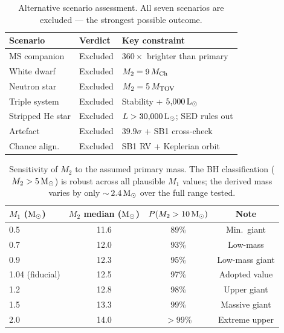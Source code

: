 \documentclass[usenatbib,fleqn]{mnras}
\newcommand{\Msun}{{\rm M}_\odot}
\newcommand{\Lsun}{{\rm L}_\odot}
\begin{document}
\begin{table}
\centering
\caption{Alternative scenario assessment.  All seven scenarios are
excluded --- the strongest possible outcome.}
\label{tab:scenarios}
\begin{tabular}{lll}
\toprule
Scenario & Verdict & Key constraint \\
\midrule
MS companion    & Excluded & $360\times$ brighter than primary \\
White dwarf     & Excluded & $M_2 = 9\,M_{\rm Ch}$ \\
Neutron star    & Excluded & $M_2 = 5\,M_{\rm TOV}$ \\
Triple system   & Excluded & Stability + $5{,}000\,\Lsun$ \\
Stripped He star & Excluded & $L > 30{,}000\,\Lsun$; SED rules out \\
Artefact        & Excluded & $39.9\sigma$ + SB1 cross-check \\
Chance align.   & Excluded & SB1 RV + Keplerian orbit \\
\bottomrule
\end{tabular}
\end{table}

\begin{table}
\centering
\caption{Sensitivity of $M_2$ to the assumed primary mass.  The
BH classification ($M_2 > 5\,\Msun$) is robust across all
plausible $M_1$ values; the derived mass varies by only
$\sim$\,$2.4\,\Msun$ over the full range tested.}
\label{tab:sensitivity}
\begin{tabular}{lccc}
\toprule
$M_1$ ($\Msun$) & $M_2$ median ($\Msun$) & $P(M_2 > 10\,\Msun)$ & Note \\
\midrule
0.5              & 11.6  & 89\%      & Min.\ giant \\
0.7              & 12.0  & 93\%      & Low-mass \\
0.9              & 12.3  & 95\%      & Low-mass giant \\
1.04 (fiducial)  & 12.5  & 97\%      & Adopted value \\
1.2              & 12.8  & 98\%      & Upper giant \\
1.5              & 13.3  & 99\%      & Massive giant \\
2.0              & 14.0  & $>$99\%   & Extreme upper \\
\bottomrule
\end{tabular}
\end{table}
\end{document}
